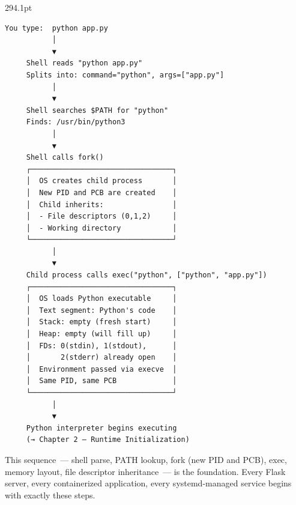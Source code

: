 \begin{diagrambox}[short]{294.1pt}
\begin{Verbatim}[fontsize=\fontsize{9.0}{8.55}\selectfont]
You type:  python app.py
           │
           ▼
     Shell reads "python app.py"
     Splits into: command="python", args=["app.py"]
           │
           ▼
     Shell searches $PATH for "python"
     Finds: /usr/bin/python3
           │
           ▼
     Shell calls fork()
     ┌─────────────────────────────────┐
     │  OS creates child process       │
     │  New PID and PCB are created    │
     │  Child inherits:                │
     │  - File descriptors (0,1,2)     │
     │  - Working directory            │
     └─────────────────────────────────┘
           │
           ▼
     Child process calls exec("python", ["python", "app.py"])
     ┌─────────────────────────────────┐
     │  OS loads Python executable     │
     │  Text segment: Python's code    │
     │  Stack: empty (fresh start)     │
     │  Heap: empty (will fill up)     │
     │  FDs: 0(stdin), 1(stdout),      │
     │       2(stderr) already open    │
     │  Environment passed via execve  │
     │  Same PID, same PCB             │
     └─────────────────────────────────┘
           │
           ▼
     Python interpreter begins executing
     (→ Chapter 2 — Runtime Initialization)
\end{Verbatim}
\end{diagrambox}

\noindent{}This sequence~--- shell parse, PATH lookup, fork (new PID and PCB), exec, memory layout, file descriptor inheritance~--- is the foundation. Every Flask server, every containerized application, every systemd-managed service begins with exactly these steps.

